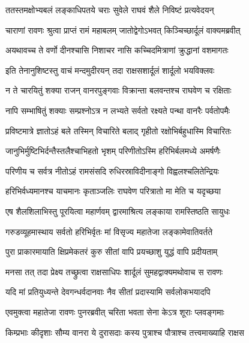 
\twolineshloka
{ततस्तमक्षोभ्यबलं लङ्काधिपतये चराः}
{सुवेले राघवं शैले निविष्टं प्रत्यवेदयन्} %

\twolineshloka
{चाराणां रावणः श्रुत्वा प्राप्तं रामं महाबलम्}
{जातोद्वेगोऽभवत् किञ्चिच्छार्दूलं वाक्यमब्रवीत्} %

\twolineshloka
{अयथावच्च ते वर्णो दीनश्चासि निशाचर}
{नासि कच्चिदमित्राणां क्रुद्धानां वशमागतः} %

\twolineshloka
{इति तेनानुशिष्टस्तु वाचं मन्दमुदीरयन्}
{तदा राक्षसशार्दूलं शार्दूलो भयविक्लवः} %

\twolineshloka
{न ते चारयितुं शक्या राजन् वानरपुङ्गवाः}
{विक्रान्ता बलवन्तश्च राघवेण च रक्षिताः} %

\twolineshloka
{नापि सम्भाषितुं शक्याः सम्प्रश्नोऽत्र न लभ्यते}
{सर्वतो रक्ष्यते पन्था वानरैः पर्वतोपमैः} %

\twolineshloka
{प्रविष्टमात्रे ज्ञातोऽहं बले तस्मिन् विचारिते}
{बलाद् गृहीतो रक्षोभिर्बहुधास्मि विचारितः} %

\twolineshloka
{जानुभिर्मुष्टिभिर्दन्तैस्तलैश्चाभिहतो भृशम्}
{परिणीतोऽस्मि हरिभिर्बलमध्ये अमर्षणैः} %

\twolineshloka
{परिणीय च सर्वत्र नीतोऽहं रामसंसदि}
{रुधिरस्राविदीनाङ्गो विह्वलश्चलितेन्द्रियः} %

\twolineshloka
{हरिभिर्वध्यमानश्च याचमानः कृताञ्जलिः}
{राघवेण परित्रातो मा मेति च यदृच्छया} %

\twolineshloka
{एष शैलशिलाभिस्तु पूरयित्वा महार्णवम्}
{द्वारमाश्रित्य लङ्काया रामस्तिष्ठति सायुधः} %

\twolineshloka
{गरुडव्यूहमास्थाय सर्वतो हरिभिर्वृतः}
{मां विसृज्य महातेजा लङ्कामेवातिवर्तते} %

\twolineshloka
{पुरा प्राकारमायाति क्षिप्रमेकतरं कुरु}
{सीतां वापि प्रयच्छाशु युद्धं वापि प्रदीयताम्} %

\twolineshloka
{मनसा तत् तदा प्रेक्ष्य तच्छ्रुत्वा राक्षसाधिपः}
{शार्दूलं सुमहद्वाक्यमथोवाच स रावणः} %

\twolineshloka
{यदि मां प्रतियुध्यन्ते देवगन्धर्वदानवाः}
{नैव सीतां प्रदास्यामि सर्वलोकभयादपि} %

\twolineshloka
{एवमुक्त्वा महातेजा रावणः पुनरब्रवीत्}
{चरिता भवता सेना केऽत्र शूराः प्लवङ्गमाः} %

\twolineshloka
{किम्प्रभाः कीदृशाः सौम्य वानरा ये दुरासदाः}
{कस्य पुत्राश्च पौत्राश्च तत्त्वमाख्याहि राक्षस} %

